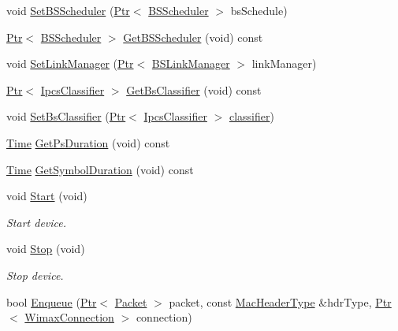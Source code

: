 \begin{DoxyCompactItemize}
void \hyperlink{classns3_1_1BaseStationNetDevice_a5fd557fae157f3110bd1efe3c1471638}{Set\+B\+S\+Scheduler} (\hyperlink{classns3_1_1Ptr}{Ptr}$<$ \hyperlink{classns3_1_1BSScheduler}{B\+S\+Scheduler} $>$ bs\+Schedule)
\item 
\hyperlink{classns3_1_1Ptr}{Ptr}$<$ \hyperlink{classns3_1_1BSScheduler}{B\+S\+Scheduler} $>$ \hyperlink{classns3_1_1BaseStationNetDevice_a2bfa87e4c2840ef970103fc164180454}{Get\+B\+S\+Scheduler} (void) const 
\item 
void \hyperlink{classns3_1_1BaseStationNetDevice_a9bfffdc229d2c1cd7003a7dc0f26396b}{Set\+Link\+Manager} (\hyperlink{classns3_1_1Ptr}{Ptr}$<$ \hyperlink{classns3_1_1BSLinkManager}{B\+S\+Link\+Manager} $>$ link\+Manager)
\item 
\hyperlink{classns3_1_1Ptr}{Ptr}$<$ \hyperlink{classns3_1_1IpcsClassifier}{Ipcs\+Classifier} $>$ \hyperlink{classns3_1_1BaseStationNetDevice_a4d104c6c640aa02fd7005ad38f4ca44f}{Get\+Bs\+Classifier} (void) const 
\item 
void \hyperlink{classns3_1_1BaseStationNetDevice_a1299e18f0ae2625402d325b781805e9f}{Set\+Bs\+Classifier} (\hyperlink{classns3_1_1Ptr}{Ptr}$<$ \hyperlink{classns3_1_1IpcsClassifier}{Ipcs\+Classifier} $>$ \hyperlink{design_8txt_af9e6b398b148789960232a87c72a107e}{classifier})
\item 
\hyperlink{classns3_1_1Time}{Time} \hyperlink{classns3_1_1BaseStationNetDevice_acb5de5e675a52c9adf059f281d10c76a}{Get\+Ps\+Duration} (void) const 
\item 
\hyperlink{classns3_1_1Time}{Time} \hyperlink{classns3_1_1BaseStationNetDevice_ac5b491995097a8731225e0a35143a58c}{Get\+Symbol\+Duration} (void) const 
\item 
void \hyperlink{classns3_1_1BaseStationNetDevice_a67d7c6397e8a2333e6be4c68224653ef}{Start} (void)
\begin{DoxyCompactList}\small\item\em Start device. \end{DoxyCompactList}\item 
void \hyperlink{classns3_1_1BaseStationNetDevice_a0cd0e8b4328a1113708f852d23fa9c32}{Stop} (void)
\begin{DoxyCompactList}\small\item\em Stop device. \end{DoxyCompactList}\item 
bool \hyperlink{classns3_1_1BaseStationNetDevice_a3c3e517ac4a08682411ed4fa0c97c037}{Enqueue} (\hyperlink{classns3_1_1Ptr}{Ptr}$<$ \hyperlink{classns3_1_1Packet}{Packet} $>$ packet, const \hyperlink{classns3_1_1MacHeaderType}{Mac\+Header\+Type} \&hdr\+Type, \hyperlink{classns3_1_1Ptr}{Ptr}$<$ \hyperlink{classns3_1_1WimaxConnection}{Wimax\+Connection} $>$ connection)

\end{DoxyCompactItemize}
